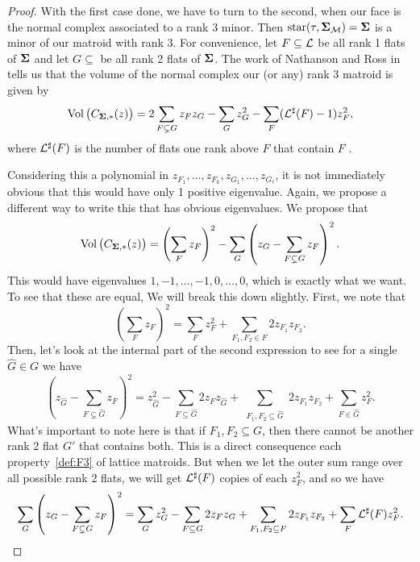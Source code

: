 \documentclass[12pt,oneside]{../../sfsuthesis}
\begin{document}
\begin{proof}
    With the first case done, we have to turn to the second, when our face is the normal complex associated to a rank 3 minor.
    Then \( \operatorname{star}(\tau, \bm{\Sigma}_{\mathcal{M}}) = \bm{\Sigma} \) is a minor of our matroid with rank 3.
    For convenience, let \( F \subseteq \mathcal{L} \) be all rank 1 flats of \( \bm{\Sigma} \) and let \( G \subseteq \) be all rank 2 flats of \( \bm{\Sigma} \).
    The work of Nathanson and Ross in \cite{nathansonTropicalFansNormal2021}  tells us that the volume of the normal complex our (or any) rank 3 matroid is given by
    \[
        \operatorname{Vol}\big(C_{\bm{\Sigma}, \ast}(z)\big) = 2\sum_{F \subsetneq G} z_F z_G - \sum_{G} z_G^2 - \sum_{F}(\mathcal{L}^\sharp(F) - 1)z_F^2,
    \]
    where \( \mathcal{L}^\sharp(F) \) is the number of flats one rank above \( F \) that contain \( F \) .

    Considering this a polynomial in \( z_{F_1}, \dots, z_{F_k}, z_{G_1}, \dots, z_{G_\ell} \), it is not immediately obvious that this would have only 1 positive eigenvalue.
    Again, we propose a different way to write this that has obvious eigenvalues.
    We propose that
    \[
        \operatorname{Vol}\big(C_{\bm{\Sigma}, \ast}(z)\big) = \left( \sum_F z_F\right)^2 - \sum_G \left( z_G - \sum_{F \subsetneq G} z_F\right)^2.
    \]
    This would have eigenvalues \( 1, -1, \dots, -1, 0, \dots, 0 \), which is exactly what we want.
    To see that these are equal, We will break this down slightly.
    First, we note that
    \begin{equation}
        \left( \sum_F z_F\right)^2 = \sum_F z_F^2 + \sum_{F_1, F_2 \in F} 2z_{F_1}z_{F_2}.
    \end{equation}
    Then, let's look at the internal part of the second expression to see for a single \( \hat{G} \in G \) we have
    \begin{equation}
        \left( z_{\hat{G}} - \sum_{F \subsetneq {\hat{G}}} z_F \right)^2 = z_{\hat{G}}^2 - \sum_{F \subseteq \hat{G}}2 z_F z_{\hat{G}} + \sum_{\substack{F_1,F_2 \subseteq \hat{G}}}2z_{F_1} z_{F_2} + \sum_{F \in \hat{G}} z_F^2.
    \end{equation}
    What's important to note here is that if \( F_1, F_2 \subseteq G \), then there cannot be another rank 2 flat \( G' \) that contains both.
    This is a direct consequence each property~\ref{def:F3} of lattice matroids.
    But when we let the outer sum range over all possible rank 2 flats, we will get \( \mathcal{L}^\sharp(F) \) copies of each \( z_F^2 \), and so we have
    \begin{equation}
        \sum_G \left( z_G - \sum_{F \subsetneq G} z_F\right)^2 =
        \sum_{G}z_G^2
        - \sum_{F \subseteq G}2 z_F z_{G}
        + \sum_{\substack{F_1,F_2 \subseteq F}}2z_{F_1} z_{F_2}
        + \sum_{F} \mathcal{L}^\sharp(F)z_F^2.
    \end{equation}


\end{proof}
\end{document}
